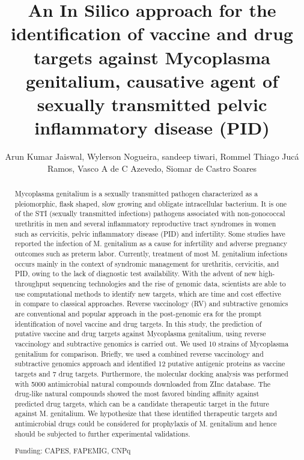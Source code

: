 \documentclass[twoside]{article}
\title{\vspace{-15mm}\fontsize{24pt}{10pt}\selectfont\textbf{ An In Silico approach for the identification of vaccine and drug targets against Mycoplasma genitalium,  causative agent of sexually transmitted pelvic inflammatory disease (PID) }} %
\author{ Arun Kumar Jaiswal, Wylerson Nogueira, sandeep tiwari, Rommel Thiago Juc\'a Ramos, Vasco A de C Azevedo, Siomar de Castro Soares }
\affil{ Universidade Federal do Tri\^angulo Mineiro }
\date{}
\begin{document}
  
  
  \maketitle %
  
  
  \thispagestyle{fancy} %
  
  
  \begin{abstract}
  Mycoplasma genitalium is a sexually transmitted pathogen characterized as a pleiomorphic,  flask shaped,  slow growing and obligate intracellular bacterium. It is one of the STI (sexually transmitted infections) pathogens associated with non-gonococcal urethritis in men and several inflammatory reproductive tract syndromes in women such as cervicitis,  pelvic inflammatory disease (PID) and infertility. Some studies have reported the infection of M. genitalium as a cause for infertility and adverse pregnancy outcomes such as preterm labor. Currently,  treatment of most M. genitalium infections occurs mainly in the context of syndromic management for urethritis,  cervicitis,  and PID,  owing to the lack of diagnostic test availability. With the advent of new high-throughput sequencing technologies and the rise of genomic data,  scientists are able to use computational methods to identify new targets,  which are time and cost effective in compare to classical approaches. Reverse vaccinology (RV) and subtractive genomics are conventional and popular approach in the post-genomic era for the prompt identification of novel vaccine and drug targets. In this study,  the prediction of putative vaccine and drug targets against Mycoplasma genitalium,  using reverse vaccinology and subtractive genomics is carried out. We used 10 strains of Mycoplasma genitalium for comparison. Briefly,  we used a combined reverse vaccinology and subtractive genomics approach and identified 12 putative antigenic proteins as vaccine targets and 7 drug targets. Furthermore,  the molecular docking analysis was performed with 5000 antimicrobial natural compounds downloaded from ZInc database. The drug-like natural compounds showed  the most  favored binding affinity against predicted drug targets,  which can be a candidate therapeutic target in the future against M. genitalium. We hypothesize that these identified therapeutic targets and antimicrobial drugs could be considered for prophylaxis of M. genitalium and hence should be subjected to further experimental validations.
  
  Funding: CAPES,  FAPEMIG,  CNPq \\ 
  \end{abstract}
  
\end{document}
